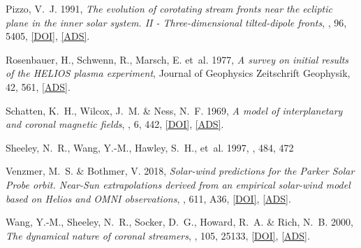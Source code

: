 	{Pizzo}, V.~J. 1991, \emph{{The evolution of corotating stream fronts near the
	ecliptic plane in the inner solar system. II - Three-dimensional
	tilted-dipole fronts}}, \jgr, 96, 5405,
	\href{http://dx.doi.org/10.1029/91JA00155}{[DOI]},
	\href{http://adsabs.harvard.edu/abs/1991JGR....96.5405P}{[ADS]}.

	{Rosenbauer}, H., {Schwenn}, R., {Marsch}, E. {et~al.} 1977, \emph{{A survey on
	initial results of the HELIOS plasma experiment}}, Journal of Geophysics
	Zeitschrift Geophysik, 42, 561,
	\href{http://adsabs.harvard.edu/abs/1977JGZG...42..561R}{[ADS]}.

	{Schatten}, K.~H., {Wilcox}, J.~M. \& {Ness}, N.~F. 1969, \emph{{A model of
	interplanetary and coronal magnetic fields}}, \solphys, 6, 442,
	\href{http://dx.doi.org/10.1007/BF00146478}{[DOI]},
	\href{http://adsabs.harvard.edu/abs/1969SoPh....6..442S}{[ADS]}.

	{Sheeley}, N.~R., {Wang}, Y.-M., {Hawley}, S.~H., {et~al.} 1997, \apj, 484, 472

	{Venzmer}, M.~S. \& {Bothmer}, V. 2018, \emph{{Solar-wind predictions for the
	Parker Solar Probe orbit. Near-Sun extrapolations derived from an empirical
	solar-wind model based on Helios and OMNI observations}}, \aap, 611, A36,
	\href{http://dx.doi.org/10.1051/0004-6361/201731831}{[DOI]},
	\href{http://adsabs.harvard.edu/abs/2018A\%26A...611A..36V}{[ADS]}.

	{Wang}, Y.-M., {Sheeley}, N.~R., {Socker}, D.~G., {Howard}, R.~A. \& {Rich},
	N.~B. 2000, \emph{{The dynamical nature of coronal streamers}}, \jgr, 105,
	25133, \href{http://dx.doi.org/10.1029/2000JA000149}{[DOI]},
	\href{http://adsabs.harvard.edu/abs/2000JGR...10525133W}{[ADS]}.

